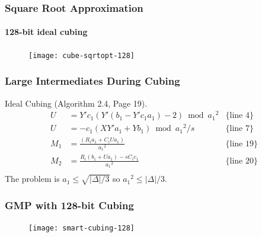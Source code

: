 \documentclass{beamer}
\begin{document}
\begin{frame}
\frametitle{Square Root Approximation}
\framesubtitle{128-bit ideal cubing}
\begin{figure}
\texttt{[image: cube-sqrtopt-128]}
\end{figure}
\end{frame}


\begin{frame}
\frametitle{Large Intermediates During Cubing}
Ideal Cubing (Algorithm 2.4, Page 19).
\begin{align*}
U &= Y'c_1(Y'(b_1 - Y'c_1a_1) - 2) \bmod {a_1}^2 & \textrm{\{line 4\}}\\
U &= -c_1(XY'a_1+Yb_1) \bmod {a_1}^2/s & \textrm{\{line 7\}} \\
M_1 &= \frac{(R_ia_1 + C_iUa_1)}{{a_1}^2} & \textrm{\{line 19\}} \\
M_2 &= \frac{R_i(b_1 + Ua_1) - sC_ic_1}{{a_1}^2} & \textrm{\{line 20\}} \\
\end{align*}
The problem is $a_1 \le \sqrt{|\Delta|/3}$ so ${a_1}^2 \le |\Delta|/3$.
\end{frame}

\begin{frame}
\frametitle{GMP with 128-bit Cubing}
\begin{figure}
\texttt{[image: smart-cubing-128]}
\end{figure}
\end{frame}
\end{document}
